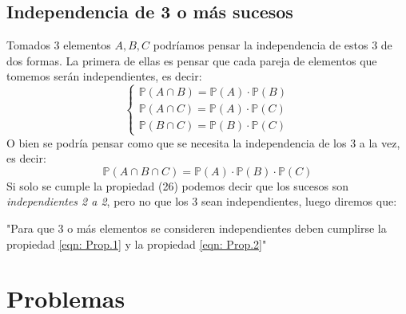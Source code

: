 \documentclass[11pt]{article}
\newcommand{\prob}{\mathbb{P}}
\theoremstyle{plain}
\begin{document}
        \subsection{Independencia de 3 o más sucesos} %
        \label{sub:independencia_de_3_o_más_sucesos}
            Tomados 3 elementos $A,B,C$ podríamos pensar la independencia de estos 3 de dos formas. La primera de ellas es pensar que cada pareja de elementos que tomemos serán independientes, es decir:
            \begin{equation}\label{eqn: Prop.1}
                \begin{cases}
                    \prob (A\cap B) = \prob (A) \cdot \prob(B)\\
                    \prob(A\cap C) = \prob(A) \cdot \prob(C)\\
                    \prob(B\cap C) = \prob(B) \cdot \prob(C)
                \end{cases}
            \end{equation}
            O bien se podría pensar como que se necesita la independencia de los 3 a la vez, es decir:
            \begin{equation}\label{eqn: Prop.2}
                \prob(A\cap B\cap C) = \prob (A) \cdot \prob(B) \cdot \prob(C)
            \end{equation}
            Si solo se cumple la propiedad (26) podemos decir que los sucesos son \textit{independientes 2 a 2}, pero no que los 3 sean independientes, luego diremos que:
            \begin{center}
                "Para que 3 o más elementos se consideren independientes deben cumplirse la propiedad \ref{eqn: Prop.1} y la propiedad \ref{eqn: Prop.2}"
            \end{center}



    \newpage
    \section{Problemas} %
    \label{sec:problemas}
\end{document}

